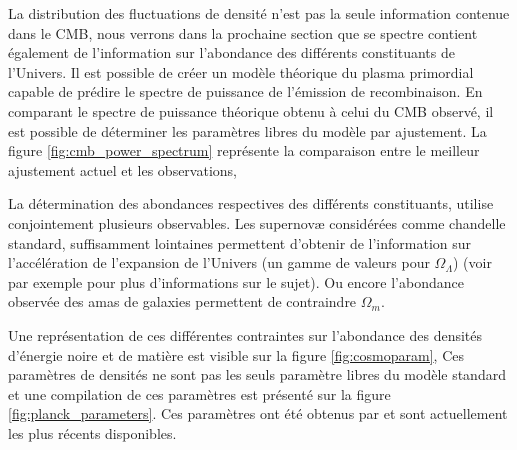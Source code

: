 La distribution des fluctuations de densité n'est pas la seule information contenue dans le \ac{CMB}, nous verrons dans la prochaine section que se spectre contient également de l'information sur l'abondance des différents constituants de l'Univers.
Il est possible de créer un modèle théorique du plasma primordial capable de prédire le spectre de puissance de l'émission de recombinaison.
En comparant le spectre de puissance théorique obtenu à celui du \ac{CMB} observé, il est possible de déterminer les paramètres libres du modèle par ajustement.
La figure \ref{fig:cmb_power_spectrum} représente la comparaison entre le meilleur ajustement actuel et les observations, 

La détermination des abondances respectives des différents constituants, utilise conjointement plusieurs observables.
Les supernovæ considérées comme chandelle standard, suffisamment lointaines permettent d'obtenir de l'information sur l'accélération de l'expansion de l'Univers (un gamme de valeurs pour $\Omega_\Lambda$) (voir par exemple \cite{1999ApJ...517..565P} pour plus d'informations sur le sujet).
Ou encore l'abondance observée des amas de galaxies permettent de contraindre $\Omega_m$.



Une représentation de ces différentes contraintes sur l'abondance des densités d'énergie noire et de matière est visible sur la figure \ref{fig:cosmoparam},
Ces paramètres de densités ne sont pas les seuls paramètre libres du modèle standard et une compilation de ces paramètres est présenté sur la figure \ref{fig:planck_parameters}.
Ces paramètres ont été obtenus par \cite{planck_collaboration_planck_2016} et sont actuellement les plus récents disponibles.

